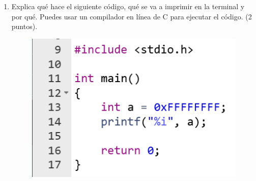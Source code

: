 \documentclass[12pt,letterpaper]{article}
\begin{document}
\begin{enumerate}
    \item Explica qué hace el siguiente código, qué se va a imprimir en la terminal y por qué. Puedes usar un compilador en línea de C para ejecutar el código. (2 puntos).
    \begin{figure}[H]
        \centering
        \includegraphics[width=0.5\linewidth]{image.png}
    \end{figure}

        
\end{enumerate}
\end{document}

